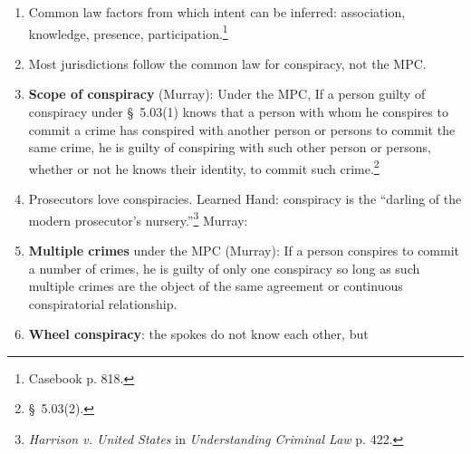 \begin{enumerate}
    evidence. \emph{Lauria} described the circumstances that can be sufficient 
    to prove that the defendant's knowledge of the criminal activity 
    demonstrates his intent to participate in the conspiracy:
    \begin{enumerate}
        \item When the purveyor of legal goods for illegal uses has acquired a 
        stake in the criminal venture.
        \item When no legitimate use for the goods or services exists.
        \item When the volume of business with the buyer is grossly 
        disproportionate to any legitimate demand.
        \item Under the MPC, there is no conspiracy where a provider of goods 
        or services is aware of the criminal activity but does not share the 
        criminal purpose, because for conspiratorial liability the MPC 
        requires an actor to act ``with the purpose of promoting or 
        facilitating'' the commission of the crime.\footnote{MPC \S\ 5.03(1).}
    \end{enumerate}
    \item Common law factors from which intent can be inferred: association, 
    knowledge, presence, participation.\footnote{Casebook p. 818.}
    \item Most jurisdictions follow the common law for conspiracy, not the 
    MPC.
    \item \textbf{Scope of conspiracy} (Murray): Under the MPC, If a person 
    guilty of conspiracy under \S\ 5.03(1) knows that a person with whom he 
    conspires to commit a crime has conspired with another person or persons 
    to commit the same crime, he is guilty of conspiring with such other 
    person or persons, whether or not he knows their identity, to commit such 
    crime.\footnote{\S\ 5.03(2).}
    \item Prosecutors love conspiracies. Learned Hand: conspiracy is the 
    ``darling of the modern prosecutor's nursery.''\footnote{\emph{Harrison v. United 
    States} in \emph{Understanding Criminal Law} p. 422.} Murray:
    \item \textbf{Multiple crimes} under the MPC (Murray): If a person 
    conspires to commit a number of crimes, he is guilty of only one 
    conspiracy so long as such multiple crimes are the object of the same 
    agreement or continuous conspiratorial relationship.
    \item \textbf{Wheel conspiracy}: the spokes do not know each other, but 

\end{enumerate}
